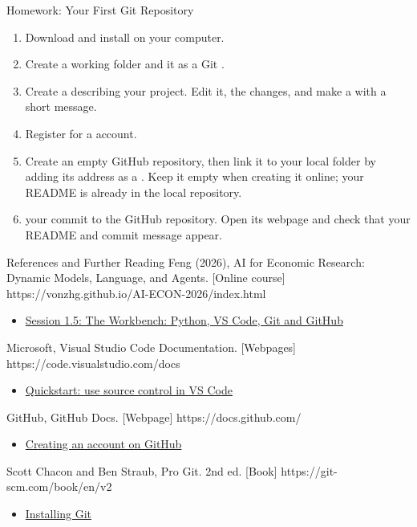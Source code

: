 \begin{frame}{Homework: Your First Git Repository}
\begin{enumerate}
\item Download and install  on your computer.
\item Create a working folder and  it as a Git .
\item Create a  describing your project. Edit it,  the changes, and make a  with a short message.
\item Register for a  account.
\item Create an empty GitHub repository, then link it to your local folder by adding its address as a . Keep it empty when creating it online; your README is already in the local repository.
\item {} your commit to the GitHub repository. Open its webpage and check that your README and commit message appear.
\end{enumerate}
\end{frame}

\begin{frame}{References and Further Reading}
  {Feng (2026), AI for Economic Research: Dynamic Models, Language, and Agents. [Online course]}
  {https://vonzhg.github.io/AI-ECON-2026/index.html}
  {\begin{itemize}
\item \href{https://vonzhg.github.io/AI-ECON-2026/slides/Session01_Deck5_Workbench_Python_Git_GitHub.pdf}{Session 1.5: The Workbench: Python, VS Code, Git and GitHub}
\end{itemize}}
  {Microsoft, Visual Studio Code Documentation. [Webpages]}
  {https://code.visualstudio.com/docs}
  {\begin{itemize}
\item \href{https://code.visualstudio.com/docs/sourcecontrol/quickstart}{Quickstart: use source control in VS Code}
\end{itemize}}
  {GitHub, GitHub Docs. [Webpage]}
  {https://docs.github.com/}
  {\begin{itemize}
\item \href{https://docs.github.com/en/account-and-profile/how-tos/account-management/creating-an-account-on-github}{Creating an account on GitHub}
\end{itemize}}
  {Scott Chacon and Ben Straub, Pro Git. 2nd ed. [Book]}
  {https://git-scm.com/book/en/v2}
  {\begin{itemize}
\item \href{https://git-scm.com/book/en/v2/Getting-Started-Installing-Git}{Installing Git}
\end{itemize}}
\end{frame}

